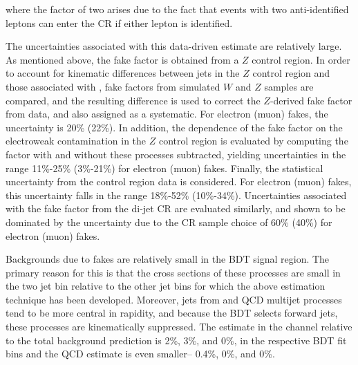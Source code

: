 \noindent
where the factor of two arises due to the fact that events with two
anti-identified leptons can enter the \wjets CR if either lepton is
identified. 

The uncertainties associated with this data-driven estimate are
relatively large. As mentioned above, the \wjets fake factor is obtained from a
$Z$ control region. In order to account for kinematic differences
between jets in the $Z$ control region and those associated
with \wjets, fake factors from simulated $W$ and $Z$ samples are
compared, and the resulting difference is used to correct the
$Z$-derived fake factor from data, and also assigned as a
systematic. For electron (muon) fakes, the uncertainty is 20\%
(22\%). In addition, the dependence of the fake factor on the
electroweak contamination in the $Z$ control region is evaluated by
computing the factor with and without these processes subtracted,
yielding uncertainties in the range 11\%-25\% (3\%-21\%) for electron
(muon) fakes. Finally, the statistical uncertainty from the control
region data is considered. For electron (muon) fakes, this
uncertainty falls in the range 18\%-52\% (10\%-34\%). Uncertainties
associated with the fake factor from the di-jet CR are evaluated
similarly, and shown to be dominated by the uncertainty due to the CR
sample choice of 60\% (40\%) for electron (muon) fakes.  

Backgrounds due to fakes are relatively small in the BDT signal
region. The primary reason for this is that the cross sections of
these processes are small in the two jet bin relative to the other jet
bins for which the above estimation technique has been
developed. Moreover, jets from \wjets and QCD multijet
processes tend to be more central in rapidity, and because the BDT
selects forward jets, these processes are kinematically
suppressed. The \wjets estimate in the
\emme channel relative to the total background prediction is 2\%, 3\%,
and 0\%, in the respective BDT fit bins and the QCD estimate is even
smaller-- 0.4\%, 0\%, and 0\%. 


